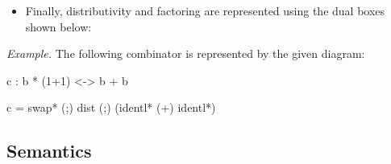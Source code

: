 \documentclass[preprint]{sigplanconf}
\begin{document}
\begin{itemize}
\item Finally, distributivity and factoring are represented using the dual
  boxes shown below:
\begin{multicols}{2}
\begin{center}
\end{center}
\begin{center}
\end{center}
\end{multicols}

\end{itemize}

\noindent 
\textit{Example.} The following combinator is represented by the given
diagram:

{{c : b * (1+1) <-> b + b}}

{{c = swap* (;) dist (;) (identl* (+) identl*)}}

\begin{center}
\end{center}

\subsection{Semantics}
\end{document}
